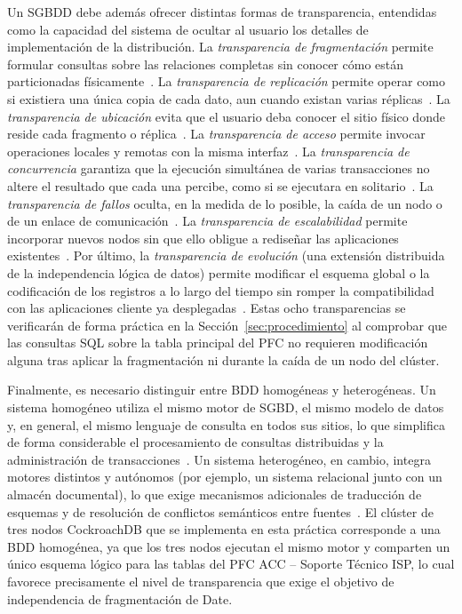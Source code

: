 \documentclass[11pt,a4paper]{article}
\begin{document}
Un SGBDD debe adem\'as ofrecer distintas formas de transparencia, entendidas
como la capacidad del sistema de ocultar al usuario los detalles de
implementaci\'on de la distribuci\'on. La \emph{transparencia de
fragmentaci\'on} permite formular consultas sobre las relaciones completas sin
conocer c\'omo est\'an particionadas f\'isicamente~\cite{ozsu2020,kleppmann2017}. La
\emph{transparencia de replicaci\'on} permite operar como si existiera una
\'unica copia de cada dato, aun cuando existan varias r\'eplicas~\cite{ozsu2020,kleppmann2017}.
La \emph{transparencia de ubicaci\'on} evita que el usuario deba conocer el
sitio f\'isico donde reside cada fragmento o r\'eplica~\cite{ozsu2020,coulouris2012}. La
\emph{transparencia de acceso} permite invocar operaciones locales y remotas
con la misma interfaz~\cite{coulouris2012,vansteen2017}. La \emph{transparencia de
concurrencia} garantiza que la ejecuci\'on simult\'anea de varias
transacciones no altere el resultado que cada una percibe, como si se
ejecutara en solitario~\cite{coulouris2012,ozsu2020}. La \emph{transparencia
de fallos} oculta, en la medida de lo posible, la ca\'ida de un nodo o de un
enlace de comunicaci\'on~\cite{coulouris2012,vansteen2017}. La \emph{transparencia
de escalabilidad} permite incorporar nuevos nodos sin que ello obligue a
rediseñar las aplicaciones existentes~\cite{coulouris2012,vansteen2017}. Por \'ultimo, la
\emph{transparencia de evoluci\'on} (una extensi\'on distribuida de la
independencia l\'ogica de datos) permite modificar el esquema global o la
codificaci\'on de los registros a lo largo del tiempo sin romper la
compatibilidad con las aplicaciones cliente ya desplegadas~\cite{kleppmann2017,ozsu2020}.
Estas ocho transparencias se verificar\'an de forma pr\'actica en la
Secci\'on~\ref{sec:procedimiento} al comprobar que las consultas SQL sobre la
tabla principal del PFC no requieren modificaci\'on alguna tras aplicar la
fragmentaci\'on ni durante la ca\'ida de un nodo del cl\'uster.

Finalmente, es necesario distinguir entre BDD homog\'eneas y heterog\'eneas.
Un sistema homog\'eneo utiliza el mismo motor de SGBD, el mismo modelo de
datos y, en general, el mismo lenguaje de consulta en todos sus sitios, lo
que simplifica de forma considerable el procesamiento de consultas
distribuidas y la administraci\'on de transacciones~\cite{ozsu2020,date2000}. Un
sistema heterog\'eneo, en cambio, integra motores distintos y aut\'onomos
(por ejemplo, un sistema relacional junto con un almac\'en documental), lo
que exige mecanismos adicionales de traducci\'on de esquemas y de
resoluci\'on de conflictos sem\'anticos entre fuentes~\cite{ozsu2020,valduriez2011}.
El cl\'uster de tres nodos CockroachDB que se implementa en esta pr\'actica
corresponde a una BDD homog\'enea, ya que los tres nodos ejecutan el mismo
motor y comparten un \'unico esquema l\'ogico para las tablas del PFC
ACC -- Soporte T\'ecnico ISP, lo cual favorece precisamente el nivel de transparencia
que exige el objetivo de independencia de fragmentaci\'on de Date.
\end{document}

